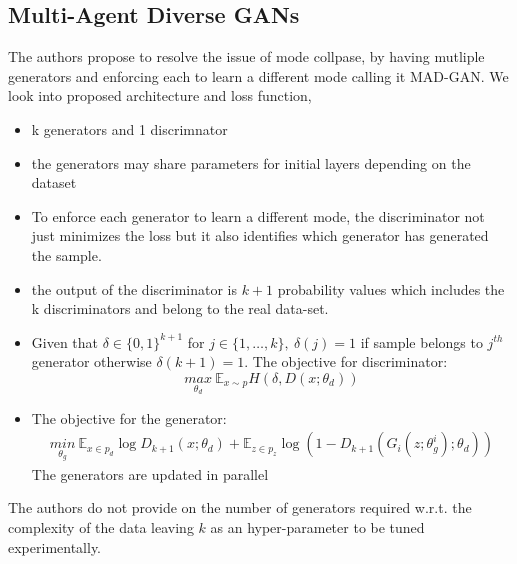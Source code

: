\subsection*{Multi-Agent Diverse GANs \citep{madgan}} The authors propose to resolve the issue of mode collpase, by having mutliple generators and enforcing each to learn a different mode calling it MAD-GAN. We look into proposed architecture and loss function,
\begin{itemize}
    \item k generators and 1 discrimnator
    \item the generators may share parameters for initial layers depending on the dataset
    \item To enforce each generator to learn a different mode, the discriminator not just minimizes the loss but it also identifies which generator has generated the sample.
    \item the output of the discriminator is $k+1$ probability values which includes the k discriminators and belong to the real data-set.
    \item Given that $\delta \in \{ 0, 1\}^{k+1}$ for $j \in \{1, \ldots, k\}, \ \delta(j)=1$ if sample belongs to $j^{th}$ generator otherwise $\delta(k+1)=1$. The objective for discriminator:
    $$ \underset{\theta_d}{max} \ \mathbb{E}_{x \sim p} H(\delta, D(x;\theta_d)) $$
    \item The objective for the generator:
    \begin{equation*}
        \begin{aligned}
        \underset{\theta_g}{min}\ \mathbb{E}_{x \in p_d} \log D_{k+1}(x; \theta_d) 
         + \mathbb{E}_{z\in p_z} \log(1- D_{k+1}(G_i(z;\theta_g^i);\theta_d))
        \end{aligned}{}
    \end{equation*}{}
    The generators are updated in parallel
\end{itemize}
The authors do not provide on the number of generators required w.r.t. the complexity of the data leaving $k$ as an hyper-parameter to be tuned experimentally.
